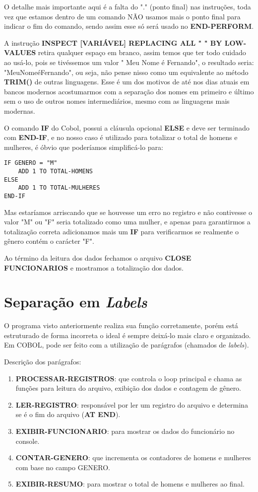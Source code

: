 O detalhe mais importante aqui é a falta do "." (ponto final) nas instruções, toda vez que estamos dentro de um comando NÃO usamos mais o ponto final para indicar o fim do comando, sendo assim esse só será usado no \textbf{END-PERFORM}.

A instrução \textbf{INSPECT [VARIÁVEL] REPLACING ALL " " BY LOW-VALUES} retira qualquer espaço em branco, assim temos que ter todo cuidado ao usá-lo, pois se tivéssemos um valor "  Meu Nome é Fernando", o resultado seria: "MeuNomeéFernando", ou seja, não pense nisso como um equivalente ao método \textbf{TRIM()} de outras linguagens. Esse é um dos motivos de até nos dias atuais em bancos modernos acostumarmos com a separação dos nomes em primeiro e último sem o uso de outros nomes intermediários, mesmo com as linguagens mais modernas.

O comando \textbf{IF} do Cobol, possui a cláusula opcional \textbf{ELSE} e deve ser terminado com \textbf{END-IF}, e no nosso caso é utilizado para totalizar o total de homens e mulheres, é óbvio que poderíamos simplificá-lo para:
\begin{lstlisting}[]
IF GENERO = "M"
    ADD 1 TO TOTAL-HOMENS
ELSE
    ADD 1 TO TOTAL-MULHERES
END-IF
\end{lstlisting}

Mas estaríamos arriscando que se houvesse um erro no registro e não contivesse o valor "M" ou "F" seria totalizado como uma mulher, e apenas para garantirmos a totalização correta adicionamos mais um \textbf{IF} para verificarmos se realmente o gênero contém o carácter "F".

Ao término da leitura dos dados fechamos o arquivo \textbf{CLOSE FUNCIONARIOS} e mostramos a totalização dos dados.

\section{Separação em \textit{Labels}}
O programa visto anteriormente realiza sua função corretamente, porém está estruturado de forma incorreta o ideal é sempre deixá-lo mais claro e organizado. Em COBOL, pode ser feito com a utilização de parágrafos (chamados de \textit{labels}).

Descrição dos parágrafos:
\begin{enumerate}
	\item \textbf{PROCESSAR-REGISTROS}: que controla o loop principal e chama as funções para leitura do arquivo, exibição dos dados e contagem de gênero.
	\item \textbf{LER-REGISTRO}: responsável por ler um registro do arquivo e determina se é o fim do arquivo (\textbf{AT END}).
	\item \textbf{EXIBIR-FUNCIONARIO}: para mostrar os dados do funcionário no console.
	\item \textbf{CONTAR-GENERO}: que incrementa os contadores de homens e mulheres com base no campo GENERO.
	\item \textbf{EXIBIR-RESUMO}: para mostrar o total de homens e mulheres ao final.
\end{enumerate}

